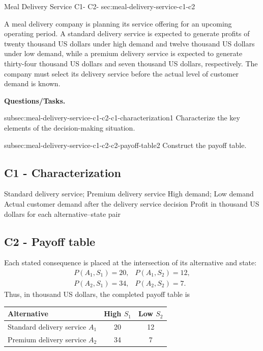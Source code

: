	\sectionScored
	{Meal Delivery Service}
	{C1- \hspace{2mm} C2-}
	{sec:meal-delivery-service-c1-c2}
	{
		A meal delivery company is planning its service offering for an upcoming operating period. A standard delivery service is expected to generate profits of twenty thousand US dollars under high demand and twelve thousand US dollars under low demand, while a premium delivery service is expected to generate thirty-four thousand US dollars and seven thousand US dollars, respectively. The company must select its delivery service before the actual level of customer demand is known.
		
		\textbf{Questions/Tasks.}
		\begin{enumerate}
			\CriterionTask
			{subsec:meal-delivery-service-c1-c2-c1-characterization}{1}
			{Characterize the key elements of the decision-making situation. }
			
			\CriterionTask
			{subsec:meal-delivery-service-c1-c2-c2-payoff-table}{2}
			{Construct the payoff table. }
		\end{enumerate}
		
		\label{subsec:meal-delivery-service-c1-c2-c1-characterization}
		\subsection*{C1 - Characterization }
		
		\DecisionElementsTable
		{Standard delivery service; Premium delivery service}
		{High demand; Low demand}
		{Actual customer demand after the delivery service decision}
		{Profit in thousand US dollars for each alternative--state pair}
		
		\label{subsec:meal-delivery-service-c1-c2-c2-payoff-table}
		\subsection*{C2 - Payoff table }
		
		Each stated consequence is placed at the intersection of its alternative and state:
		\[
		\begin{array}{ll}
			P(A_1,S_1)=20, & P(A_1,S_2)=12,\\
			P(A_2,S_1)=34, & P(A_2,S_2)=7.
		\end{array}
		\]
		Thus, in thousand US dollars, the completed payoff table is
		\begin{center}
			\begin{tabular}{lcc}
				\toprule
				Alternative & High \(S_1\) & Low \(S_2\)\\
				\midrule
				Standard delivery service \(A_1\) & 20 & 12\\
				Premium delivery service \(A_2\) & 34 & 7\\
				\bottomrule
			\end{tabular}
		\end{center}
		
		\vspace{-5mm}
		
	}
	
